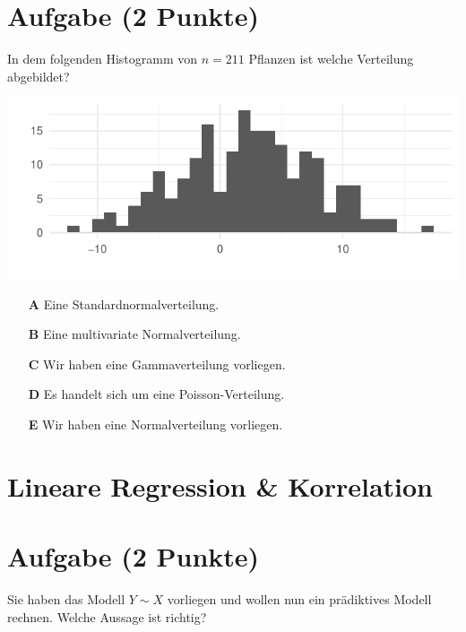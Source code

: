 \documentclass[a4paper, 9pt]{scrartcl}\usepackage[]{graphicx}\usepackage[]{xcolor}
\makeatletter
\def\maxwidth{ %
  \ifdim\Gin@nat@width>\linewidth
    \linewidth
  \else
    \Gin@nat@width
  \fi
}
\makeatother
\begin{document}
\section{Aufgabe \hfill (2 Punkte)}



In dem folgenden Histogramm von $n = 211$ Pflanzen ist welche Verteilung abgebildet?



{\centering \includegraphics[width=\maxwidth]{img/mc-distribution-02-a-1} 

}







\begin{enumerate}
\item [\textbf{A} \msquare] Eine Standardnormalverteilung.
\item [\textbf{B} \msquare] Eine multivariate Normalverteilung.
\item [\textbf{C} \msquare] Wir haben eine Gammaverteilung vorliegen.
\item [\textbf{D} \msquare] Es handelt sich um eine Poisson-Verteilung.
\item [\textbf{E} \msquare] Wir haben eine Normalverteilung vorliegen.
\end{enumerate} 
\section*{Lineare Regression \& Korrelation}

\section{Aufgabe \hfill (2 Punkte)}



Sie haben das Modell $Y \sim X$ vorliegen und wollen nun ein prädiktives Modell rechnen. Welche Aussage ist richtig?
\end{document}
